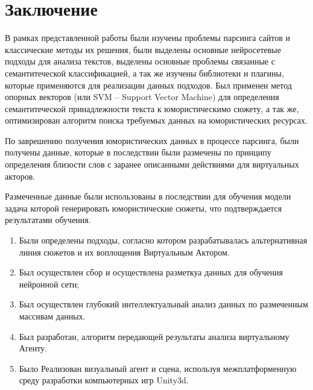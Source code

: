 \chapter*{Заключение}

В рамках представленной работы были изучены проблемы парсинга сайтов и классические методы их решения,
были выделены основные нейросетевые подходы для анализа текстов, выделены основные проблемы связанные 
с семантитеческой классификацией, а так же изучены библиотеки и плагины, которые применяются для реализации данных подходов. 
Был применен метод опорных векторов (или SVM – Support Vector Machine) 
для определения семантитеческой принадлежности текста к юмористическимо сюжету, а так же, 
оптимизирован алгоритм поиска требуемых данных на юмористических ресурсах. 

По заврешению получения юмористических данных в процессе парсинга, были получены данные, которые 
в последствии были размечены по принципу определения близости слов с заранее описанными действиями
для виртуальных акторов.

Размеченные данные были использованы в последствии для обучения модели задача которой генерировать 
юмористические сюжеты, что подтверждается результатами обучения.
\begin{enumerate}
    \item Были определены подходы, согласно котором разрабатывалась альтернативная линия сюжетов и их воплощения Виртуальным Актором.
    \item Был осуществлен сбор и осуществлена разметкуа данных для обучения нейронной сети;
    \item Был осуществлен глубокий интеллектуальный анализ данных по размеченным массивам данных.
    \item Был разработан, алгоритм передающей результаты анализа виртуальному Агенту.
    \item Было Реализован визуальный агент и сцена, используя межплатформенную среду разработки компьютерных игр Unity3d.
\end{enumerate}



